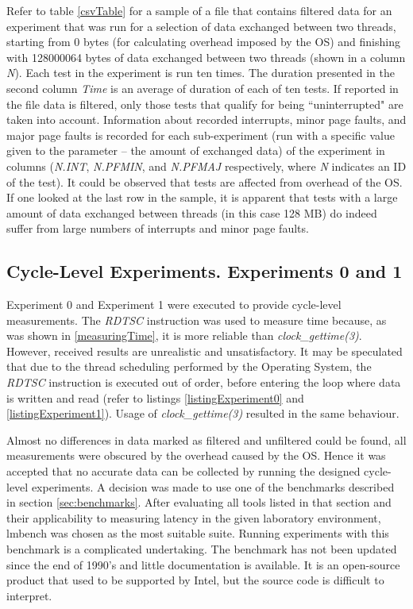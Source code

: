 Refer to table \ref{csvTable} for a sample of a file that contains filtered data for an experiment that was run for a selection of data exchanged between two threads, starting from 0 bytes (for calculating overhead imposed by the OS) and finishing with 128000064 bytes of data exchanged between two threads (shown in a column \textit{N}). Each test in the experiment is run ten times. The duration presented in the second column \textit{Time} is an average of duration of each of ten tests. If reported in the file data is filtered, only those tests that qualify for being ``uninterrupted" are taken into account. Information about recorded interrupts, minor page faults, and major page faults is recorded for each sub-experiment (run with a specific value given to the parameter -- the amount of exchanged data) of the experiment in columns (\textit{N.INT}, \textit{N.PFMIN}, and \textit{N.PFMAJ} respectively, where \textit{N} indicates an ID of the test). It could be observed that tests are affected from overhead of the OS. If one looked at the last row in the sample, it is apparent that tests with a large amount of data exchanged between threads (in this case 128 MB) do indeed suffer from large numbers of interrupts and minor page faults.

\subsection{Cycle-Level Experiments. Experiments 0 and 1}
\label{conducting_cycle}

Experiment 0 and Experiment 1 were executed to provide cycle-level measurements. The \textit{RDTSC} instruction was used to measure time because, as was shown in \ref{measuringTime}, it is more reliable than \textit{clock\_gettime(3)}. However, received results are unrealistic and unsatisfactory. It may be speculated that due to the thread scheduling performed by the Operating System, the \textit{RDTSC} instruction is executed out of order, before entering the loop where data is written and read (refer to listings \ref{listingExperiment0} and \ref{listingExperiment1}). Usage of \textit{clock\_gettime(3)} resulted in the same behaviour.

Almost no differences in data marked as filtered and unfiltered could be found, all measurements were obscured by the overhead caused by the OS. Hence it was accepted that no accurate data can be collected by running the designed cycle-level experiments. A decision was made to use one of the benchmarks described in section \ref{sec:benchmarks}. After evaluating all tools listed in that section and their applicability to measuring latency in the given laboratory environment, lmbench \cite{McVoy2012} was chosen as the most suitable suite. Running experiments with this benchmark is a complicated undertaking. The benchmark has not been updated since the end of 1990's and little documentation is available. It is an open-source product that used to be supported by Intel, but the source code is difficult to interpret.


